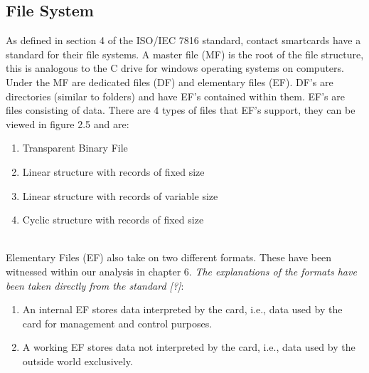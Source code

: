 \documentclass[bsc,frontabs,twoside,singlespacing,parskip,deptreport]{infthesis}     %
\begin{document}
\subsection{File System}

As defined in section 4 of the ISO/IEC 7816 standard, contact smartcards have a standard for their file systems. A master file (MF) is the root of the file structure, this is analogous to the C drive for windows operating systems on computers. Under the MF are dedicated files (DF) and elementary files (EF). DF's are directories (similar to folders) and have EF's contained within them. EF's are files consisting of data. There are 4 types of files that EF's support, they can be viewed in figure 2.5 and are:
\begin{enumerate}
\item Transparent Binary File
\item Linear structure with records of fixed size
\item Linear structure with records of variable size
\item Cyclic structure with records of fixed size\\\\
\end{enumerate}

Elementary Files (EF) also take on two different formats. These have been witnessed within our analysis in chapter 6. \textit{The explanations of the formats have been taken directly from the standard [?]}:
\begin{enumerate}
\item An internal EF stores data interpreted by the card, i.e., data used by the card for management and
control purposes.
\item A working EF stores data not interpreted by the card, i.e., data used by the outside world exclusively.
\end{enumerate}
\end{document}
